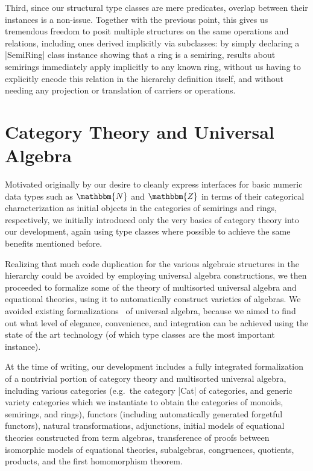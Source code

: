 \documentclass{llncs}
\newcommand{\N}{\ensuremath{\mathbbm{N}}}
\newcommand{\Z}{\ensuremath{\mathbbm{Z}}}
\begin{document}
Third, since our structural type classes are mere predicates, overlap between their instances is a non-issue. Together with the previous point, this gives us tremendous freedom to posit multiple structures on the same operations and relations, including ones derived implicitly via subclasses: by simply declaring a |SemiRing| class instance showing that a ring is a semiring, results about semirings immediately apply implicitly to any known ring, without us having to explicitly encode this relation in the hierarchy definition itself, and without needing any projection or translation of carriers or operations.

\section{Category Theory and Universal Algebra}\label{interfaces}\label{modul}

Motivated originally by our desire to cleanly express interfaces for basic numeric data types such as $\N$ and $\Z$ in terms of their categorical characterization as initial objects in the categories of semirings and rings, respectively, we initially introduced only the very basics of category theory into our development, again using type classes where possible to achieve the same benefits mentioned before.

Realizing that much code duplication for the various algebraic structures in the hierarchy could be avoided by employing universal algebra constructions, we then proceeded to formalize some of the theory of multisorted universal algebra and equational theories, using it to automatically construct varieties of algebras. We avoided existing formalizations~\cite{DBLP:conf/tphol/Capretta99,dominguez2008formalizing} of universal algebra, because we aimed to find out what level of elegance, convenience, and integration can be achieved using the state of the art technology (of which type classes are the most important instance).

At the time of writing, our development includes a fully integrated formalization of a nontrivial portion of category theory and multisorted universal algebra, including various categories (e.g.\ the category |Cat| of categories, and generic variety categories which we instantiate to obtain the categories of monoids, semirings, and rings), functors (including automatically generated forgetful functors), natural transformations, adjunctions, initial models of equational theories constructed from term algebras, transference of proofs between isomorphic models of equational theories, subalgebras, congruences, quotients, products, and the first homomorphism theorem.
\end{document}
